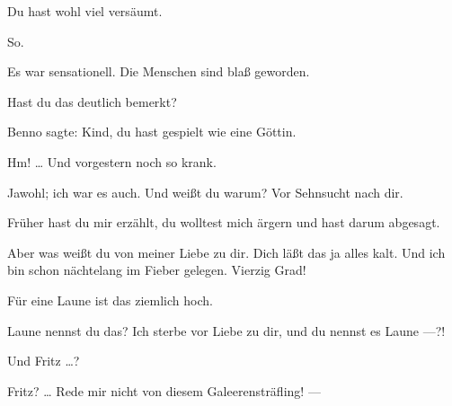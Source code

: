 \documentclass[
	final,
	a4paper,
	ngerman,
	mpinclude = true, %
	twoside = true,
	open = right,
	cleardoublepage = plain,
	DIV = 13,
	BCOR = 1cm,
	titlepage = firstiscover,
	]{scrbook}
\newcommand{\thecharacter}[1]{\textup{\textsc{#1}}\xspace}
\newcommand{\thedichter}{\thecharacter{Robert Bibitz}}
\newcommand{\theschauspielerin}{\thecharacter{Daniela}}
\newcommand{\character}[1]{\item[#1:]}
\newcommand{\dichter}{\character{\thedichter}}
\newcommand{\schauspielerin}{\character{\theschauspielerin}}
\begin{document}
\begin{play}
	\schauspielerin
	Du hast wohl viel versäumt.

	\dichter
	So.

	\schauspielerin
	Es war sensationell. Die Menschen sind blaß geworden.

	\dichter
	Hast du das deutlich bemerkt?

	\schauspielerin
	Benno sagte: Kind, du hast gespielt wie eine Göttin.

	\dichter
	Hm! \ldots{} Und vorgestern noch so krank.

	\schauspielerin
	Jawohl; ich war es auch. Und weißt du warum? Vor Sehnsucht nach dir.

	\dichter
	Früher hast du mir erzählt, du wolltest mich ärgern und hast darum abgesagt.

	\schauspielerin
	Aber was weißt du von meiner Liebe zu dir. Dich läßt das ja alles kalt. Und ich bin schon nächtelang im Fieber gelegen. Vierzig Grad!

	\dichter
	Für eine Laune ist das ziemlich hoch.

	\schauspielerin
	Laune nennst du das? Ich sterbe vor Liebe zu dir, und du nennst es Laune ---?!

	\dichter
	Und Fritz \ldots{}?

	\schauspielerin
	Fritz? \ldots{} Rede mir nicht von diesem Galeerensträfling! ---

\end{play}
\end{document}
